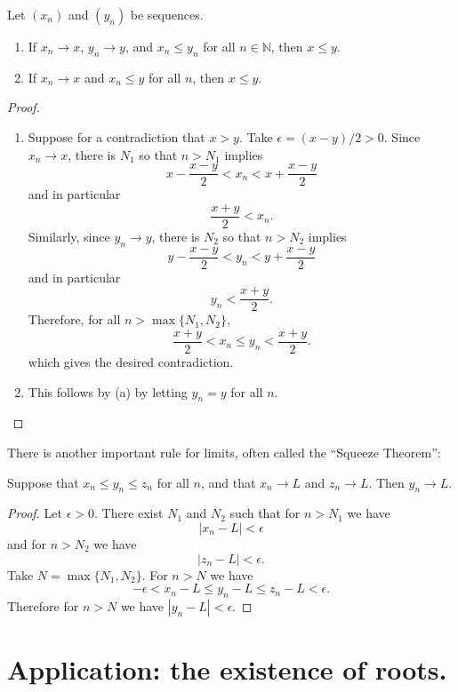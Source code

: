 \documentclass[11pt,dvipsnames]{book}
\numberwithin{figure}{section} %
\numberwithin{table}{section} %
\begin{document}
\begin{proposition}
\label{p:x_n<y_n}
Let $(x_{n})$ and $(y_{n})$ be sequences.
\begin{enumerate}[label=(\alph*)]
\item  If $x_{n}\rightarrow x$, $y_{n}\rightarrow y$, and $x_{n}\leq y_{n}$ for all $n\in\mathbb{N}$, then $x\leq y$.
\item If $x_n\rightarrow x$ and $x_{n}\leq y$ for all $n$, then $x\leq y$.
\end{enumerate}
\end{proposition}

\begin{proof}
\begin{enumerate}[label=(\alph*)]
\item  Suppose for a contradiction that $x>y$. Take $\epsilon = (x-y)/2 > 0$. Since $x_{n}\rightarrow x$, there is $N_{1}$ so that $n > N_{1}$ implies
\[
x-\frac{x-y}{2}<x_{n}<x+\frac{x-y}{2}
\]
and in particular
\[
\frac{x+y}{2}<x_{n}.
\]
Similarly, since $y_{n}\rightarrow y$, there is $N_{2}$ so that $n > N_{2}$ implies
\[
y-\frac{x-y}{2}<y_{n}<y+\frac{x-y}{2}
\]
and in particular
\[
y_{n}<\frac{x+y}{2}.
\]
Therefore, for all $n>  \max\{N_{1},N_{2}\}$,
\[
\frac{x+y}{2}<x_{n} \leq y_n < \frac{x+y}{2}.
\]
which gives the desired contradiction.

\item This follows by (a) by letting $y_{n}=y$ for all $n$.
\end{enumerate}
\end{proof}

There is another important rule for limits, often called the ``Squeeze Theorem'':

\begin{proposition}\label{squeeze}
Suppose that $x_n \leq y_n \leq z_n$ for all $n$, and that $x_n \to L$ and $z_n \to L$. Then $y_n \to L$.
\end{proposition}

\begin{proof}
Let $\epsilon > 0$. There exist $N_1$ and $N_2$ such that for $n > N_1$ we have
\[ |x_n - L| < \epsilon\]
and for $n > N_2$ we have
\[ |z_n - L| < \epsilon.\]
Take $N = \max\{N_1, N_2\}$. For $n > N$ we have
\[ - \epsilon < x_n - L \leq y_n - L \leq z_n - L < \epsilon.\]
Therefore for $n > N$ we have $|y_n - L| < \epsilon$.
\end{proof}

\section{Application: the existence of roots.}%
\label{existenceofroots}
\end{document}
